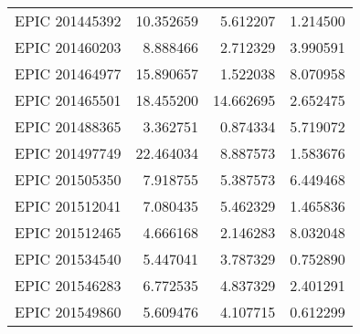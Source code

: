\begin{tabular}{lrrr}
 EPIC 201445392 &  10.352659 &   5.612207 &   1.214500 \\
 EPIC 201460203 &   8.888466 &   2.712329 &   3.990591 \\
 EPIC 201464977 &  15.890657 &   1.522038 &   8.070958 \\
 EPIC 201465501 &  18.455200 &  14.662695 &   2.652475 \\
 EPIC 201488365 &   3.362751 &   0.874334 &   5.719072 \\
 EPIC 201497749 &  22.464034 &   8.887573 &   1.583676 \\
 EPIC 201505350 &   7.918755 &   5.387573 &   6.449468 \\
 EPIC 201512041 &   7.080435 &   5.462329 &   1.465836 \\
 EPIC 201512465 &   4.666168 &   2.146283 &   8.032048 \\
 EPIC 201534540 &   5.447041 &   3.787329 &   0.752890 \\
 EPIC 201546283 &   6.772535 &   4.837329 &   2.401291 \\
 EPIC 201549860 &   5.609476 &   4.107715 &   0.612299 \\
\bottomrule
\end{tabular}
